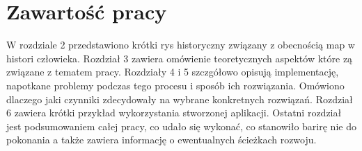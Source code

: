 \section{Zawartość pracy}
\label{sec:zawartoscPracy}


W rozdziale 2 przedstawiono krótki rys historyczny związany z obecnością map w histori człowieka. Rozdział 3 zawiera omówienie teoretycznych aspektów które zą związane z tematem pracy. Rozdziały 4 i 5 szczgółowo opisują implementację, napotkane problemy podczas tego procesu i sposób ich rozwiązania. Omówiono dlaczego jaki czynniki zdecydowały na wybrane konkretnych rozwiązań. Rozdział 6 zawiera krótki przykład wykorzystania stworzonej aplikacji. Ostatni rozdział jest podsumowaniem całej pracy, co udało się wykonać, co stanowiło barirę nie do pokonania a także zawiera informację o ewentualnych ścieżkach rozwoju. 















